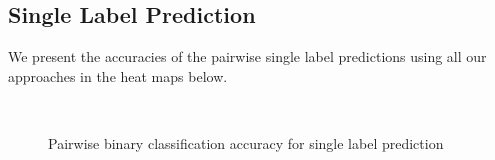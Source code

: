 \documentclass{article} %
\begin{document}
 \subsection{Single Label Prediction}
 We present the accuracies of the pairwise single label predictions using all our approaches in the heat maps below.
\begin{figure}[ht]
\vspace{-0.5cm}
\centering
{} \\
\caption{Pairwise binary classification accuracy for single label prediction}
\label{fig:singlelab1}
\end{figure}
\end{document}
